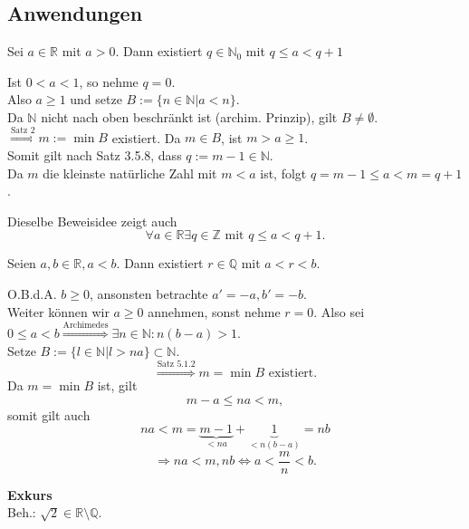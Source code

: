 \documentclass[../ana1.tex]{subfiles}
\begin{document}
\subsection{Anwendungen}
\begin{lem}
	Sei $a\in\mathbb{R}$ mit $a>0$. Dann existiert $q\in\mathbb{N}_0$ mit $q\leq a<q+1$
\end{lem}
\begin{bew}
	Ist $0<a<1$, so nehme $q = 0$.\\
	Also $a\geq 1$ und setze $B:=\{n\in\mathbb{N}|a<n\}$.\\
	Da $\mathbb{N}$ nicht nach oben beschränkt ist (archim. Prinzip), gilt $B\neq \emptyset$.\\
	$\overset{\text{Satz 2}}{\Rightarrow} m:=\min B$ existiert. Da $m\in B$, ist $m> a \geq 1$.\\
	Somit gilt nach Satz 3.5.8, dass $q:= m-1\in\mathbb{N}$.\\
	Da $m$ die kleinste natürliche Zahl mit $m<a$ ist, folgt $q = m-1 \leq a < m = q+1$.
\end{bew}
\begin{bem}
	Dieselbe Beweisidee zeigt auch $$\forall a\in\mathbb{R}\exists q\in\mathbb{Z} \text{ mit } q\leq a<q+1.$$
\end{bem}
\begin{satz}
	Seien $a,b\in\mathbb{R}, a<b$. Dann existiert $r\in\mathbb{Q}$ mit $a<r<b$.
\end{satz}
\begin{bew}
	O.B.d.A. $b\geq 0$, ansonsten betrachte $a'=-a, b'=-b$.\\
	Weiter können wir $a\geq 0$ annehmen, sonst nehme $r=0$.
	Also sei $0\leq a <b \overset{\text{Archimedes}}{\Rightarrow} \exists n\in\mathbb{N}: n(b-a)>1$.\\
	Setze $B:=\{l\in\mathbb{N}|l>na\} \subset \mathbb{N}$.
	$$\overset{\text{Satz 5.1.2}}{\Rightarrow} m = \min B \text{ existiert}.$$
	Da $m=\min B$ ist, gilt $$m -a\leq na<m,$$ somit gilt auch $$na<m=\underbrace{m-1}_{<na}+\underbrace{1}_{<n(b-a)}=nb$$
	$$\Rightarrow na<m,nb \Leftrightarrow a<\frac{m}{n}<b.$$
\end{bew}
\textbf{Exkurs}\\
Beh.: $\sqrt{2}\in\mathbb{R}\setminus \mathbb{Q}.$
\end{document}
